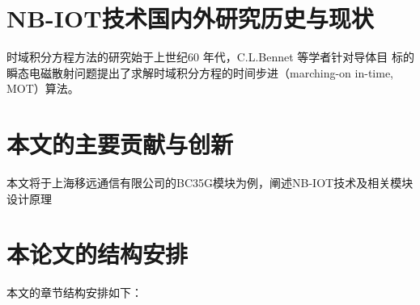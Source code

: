 \section{NB-IOT技术国内外研究历史与现状}
时域积分方程方法的研究始于上世纪60 年代，C.L.Bennet 等学者针对导体目
标的瞬态电磁散射问题提出了求解时域积分方程的时间步进（marching-on in-time,
MOT）算法。

\section{本文的主要贡献与创新}
本文将于上海移远通信有限公司的BC35G模块为例，阐述NB-IOT技术及相关模块设计原理

\section{本论文的结构安排}
本文的章节结构安排如下：
